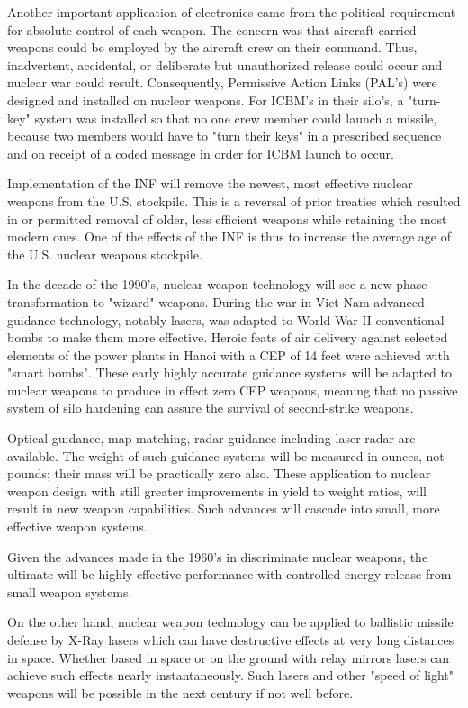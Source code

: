 Another important application of electronics came from the political requirement for absolute control of each weapon. The concern was that aircraft-carried weapons could be employed by the aircraft crew on their command. Thus, inadvertent, accidental, or deliberate but unauthorized release could occur and nuclear war could result. Consequently, Permissive Action Links (PAL's) were designed and installed on nuclear weapons. For ICBM's in their silo's, a "turn-key" system was installed so that no one crew member could launch a missile, because two members would have to "turn their keys" in a prescribed sequence and on receipt of a coded message in order for ICBM launch to occur.

Implementation of the INF will remove the newest, most effective nuclear weapons from the U.S. stockpile. This is a reversal of prior treaties which resulted in or permitted removal of older, less efficient weapons while retaining the most modern ones. One of the effects of the INF is thus to increase the average age of the U.S. nuclear weapons stockpile.

In the decade of the 1990's, nuclear weapon technology will see a new phase -- transformation to "wizard" weapons. During the war in Viet Nam advanced guidance technology, notably lasers, was adapted to World War II conventional bombs to make them more effective. Heroic feats of air delivery against selected elements of the power plants in Hanoi with a CEP of 14 feet were achieved with "smart bombs". These early highly accurate guidance systems will be adapted to nuclear weapons to produce in effect zero CEP weapons, meaning that no passive system of silo hardening can assure the survival of second-strike weapons.

Optical guidance, map matching, radar guidance including laser radar are available. The weight of such guidance systems will be measured in ounces, not pounds; their mass will be practically zero also. These application to nuclear weapon design with still greater improvements in yield to weight ratios, will result in new weapon capabilities. Such advances will cascade into small, more effective weapon systems.

Given the advances made in the 1960's in discriminate nuclear weapons, the ultimate will be highly effective performance with controlled energy release from small weapon systems.

On the other hand, nuclear weapon technology can be applied to ballistic missile defense by X-Ray lasers which can have destructive effects at very long distances in space. Whether based in space or on the ground with relay mirrors lasers can achieve such effects nearly instantaneously. Such lasers and other "speed of light" weapons will be possible in the next century if not well before.

